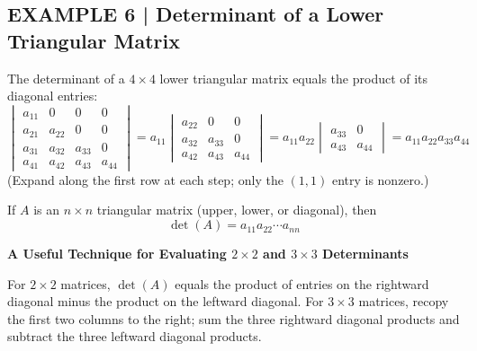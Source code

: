 \documentclass{article}
\newcommand{\redheading}[1]{{\vspace{2mm}\noindent\Large\bfseries\color{red!55!black} #1\par}\vspace{2mm}}
\theoremstyle{mystyle}
\begin{document}
\subsection*{EXAMPLE 6 | Determinant of a Lower Triangular Matrix}
The determinant of a $4\times4$ lower triangular matrix equals the product of its diagonal entries:
\[
\begin{vmatrix}a_{11}&0&0&0\\a_{21}&a_{22}&0&0\\a_{31}&a_{32}&a_{33}&0\\a_{41}&a_{42}&a_{43}&a_{44}\end{vmatrix}
=a_{11}\begin{vmatrix}a_{22}&0&0\\a_{32}&a_{33}&0\\a_{42}&a_{43}&a_{44}\end{vmatrix}
=a_{11}a_{22}\begin{vmatrix}a_{33}&0\\a_{43}&a_{44}\end{vmatrix}
=a_{11}a_{22}a_{33}a_{44}
\]
(Expand along the first row at each step; only the $(1,1)$ entry is nonzero.)

\begin{tcolorbox}[colback=red!4, colframe=red!60!black,
  title={\textbf{Theorem 2.1.2}}, boxrule=0.5mm, arc=3mm]
If $A$ is an $n\times n$ triangular matrix (upper, lower, or diagonal), then
\[
\det(A)=a_{11}a_{22}\cdots a_{nn}
\]
\end{tcolorbox}

\redheading{A Useful Technique for Evaluating $2\times2$ and $3\times3$ Determinants}

For $2\times2$ matrices, $\det(A)$ equals the product of entries on the rightward diagonal minus the product on the leftward diagonal. For $3\times3$ matrices, recopy the first two columns to the right; sum the three rightward diagonal products and subtract the three leftward diagonal products.
\end{document}
